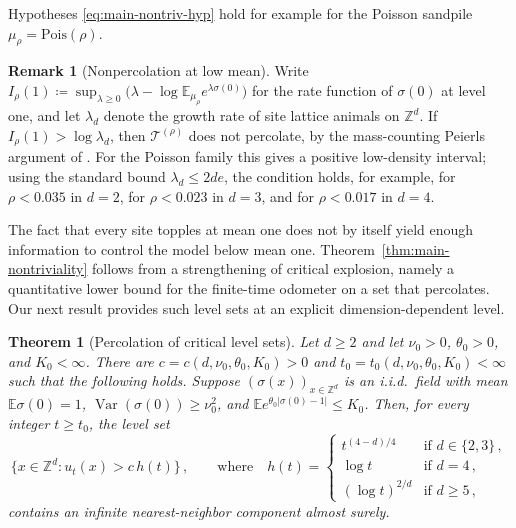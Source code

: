 \documentclass[11pt]{amsart}
\theoremstyle{plain}
\newtheorem{theorem}{Theorem}[section]
\theoremstyle{definition}
\newtheorem*{remark*}{Remark}
\newcommand{\Z}{\mathbb{Z}}
\newcommand{\E}{\mathbb{E}}
\DeclareMathOperator{\Var}{Var}
\begin{document}
Hypotheses \eqref{eq:main-nontriv-hyp} hold for example for the Poisson sandpile $\mu_\rho=\mathrm{Pois}(\rho)$.

\begin{remark*}[Nonpercolation at low mean]
Write $I_\rho(1)\coloneqq\sup_{\lambda\geq0}\bigl(\lambda-\log\E_{\mu_\rho}e^{\lambda\sigma(0)}\bigr)$ for the rate function of $\sigma(0)$ at level one, and let $\lambda_d$ denote the growth rate of site lattice animals on $\Z^d$. If $I_\rho(1)>\log\lambda_d$, then $\mathcal T^{(\rho)}$ does not percolate, by the mass-counting Peierls argument of \citet[Theorem~4.2]{FMR}. For the Poisson family this gives a positive low-density interval; using the standard bound $\lambda_d\leq2de$, the condition holds, for example, for $\rho<0.035$ in $d=2$, for $\rho<0.023$ in $d=3$, and for $\rho<0.017$ in $d=4$.
\end{remark*}

The fact that every site topples at mean one does not by itself yield enough information to control the model below mean one. Theorem~\ref{thm:main-nontriviality} follows from a strengthening of critical explosion, namely a quantitative lower bound for the finite-time odometer on a set that percolates. Our next result provides such level sets at an explicit dimension-dependent level.

\begin{theorem}[Percolation of critical level sets]\label{thm:main-critical-level-percolation}
Let $d\geq2$ and let $\nu_{0}>0$, $\theta_{0}>0$, and $K_{0}<\infty$. There are $c=c(d,\nu_{0},\theta_{0},K_{0})>0$ and $t_0=t_0(d,\nu_{0},\theta_{0},K_{0})<\infty$ such that the following holds. Suppose $(\sigma(x))_{x\in\Z^d}$ is an i.i.d.\ field with mean $\E\sigma(0)=1$, $\Var(\sigma(0))\geq\nu_{0}^2$, and $\E e^{\theta_{0}|\sigma(0)-1|}\leq K_{0}$. Then, for every integer $t\geq t_0$, the level set
\[
    \{x\in\Z^d:u_t(x)>c \, h(t)\}\, ,
    \qquad\text{where}\quad
    h(t)=
    \begin{cases}
    t^{(4-d)/4} & \text{if } d\in\{2,3\}\, ,\\
    \log t & \text{if } d=4\, ,\\
    (\log t)^{2/d} & \text{if } d\geq5\, ,
    \end{cases}
\]
contains an infinite nearest-neighbor component almost surely. 
\end{theorem}
\end{document}
